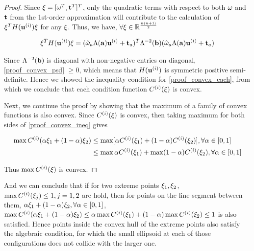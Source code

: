 \documentclass{article}
\begin{document}
\begin{proof}
Since ${\bf \xi} = [{\bf \omega}^T, {\bf t}^T]^T$, only the quadratic terms with respect to both ${\bf \omega}$ and ${\bf t}$ from the 1st-order approximation will contribute to the calculation of ${\bf \xi}^T H({\bf u}^{(i)}) {\bf \xi}$ for any ${\bf \xi}$. Thus, we have, $\forall {\bf \xi} \in \mathbb{R}^{\frac{n(n+1)}{2}}$
	
\begin{equation}
\label{proof_convex_psd}
{\bf \xi}^T H({\bf u}^{(i)}) {\bf \xi} = (\hat{\omega}_a \Lambda({\bf a}) {\bf u}^{(i)} + {\bf t}_a)^T \Lambda^{-2}({\bf b}) (\hat{\omega}_a \Lambda({\bf a}) {\bf u}^{(i)} + {\bf t}_a)
\end{equation}
	
Since $\Lambda^{-2}({\bf b})$ is diagonal with non-negative entries on diagonal, \eqref{proof_convex_psd} $\geq 0$, which means that $H({\bf u}^{(i)})$ is symmetric positive semi-definite. Hence we showed the inequality condition for \eqref{proof_convex_each}, from which we conclude that each condition function $C^{(i)}({\bf \xi})$ is convex.
	
Next, we continue the proof by showing that the maximum of a family of convex functions is also convex. Since $C^{(i)}({\bf \xi})$ is convex, then taking maximum for both sides of \eqref{proof_convex_ineq} gives
	
\begin{equation}
\begin{aligned}
\max C^{(i)}(\alpha {\bf \xi}_1 + (1-\alpha) {\bf \xi}_2) &\leq \max [\alpha C^{(i)}({\bf \xi}_1) + (1-\alpha) C^{(i)}({\bf \xi}_2)],  \forall  \alpha \in [0,1]\\
&\leq \max \alpha C^{(i)}({\bf \xi}_1) + \max (1-\alpha) C^{(i)}({\bf \xi}_2),  \forall  \alpha \in [0,1] \\
\end{aligned}
\end{equation}
	
Thus $\max C^{(i)}({\bf \xi})$ is convex. 
\end{proof}
And we can conclude that if for two extreme points ${\bf \xi}_1, {\bf \xi}_2$, $\max C^{(i)}({\bf \xi}_j) \leq 1, j=1,2$ are hold, then for points on the line segment between them, $\alpha {\bf \xi}_1 + (1-\alpha) {\bf \xi}_2, \forall \alpha \in [0,1]$, $\max C^{(i)}(\alpha {\bf \xi}_1 + (1-\alpha) {\bf \xi}_2) \leq \alpha \max C^{(i)}({\bf \xi}_1) + (1-\alpha) \max C^{(i)}({\bf \xi}_2) \leq 1$ is also satisfied. Hence points inside the convex hull of the extreme points also satisfy the algebraic condition, for which the small ellipsoid at each of those configurations does not collide with the larger one. 
\end{document}
